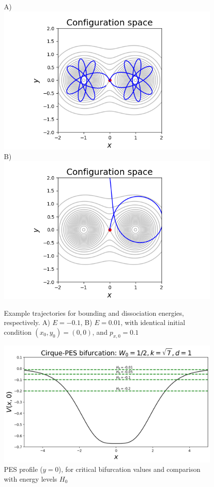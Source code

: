 \documentclass[10pt,aps,onecolumn,superscriptaddress]{revtex4-2}
\begin{document}
\begin{figure}
    \centering
    A)\includegraphics{traj_type2.png}
    B)\includegraphics{traj_escapping.png}
    \caption{Example trajectories for bounding and dissociation energies, respectively. A) $E = -0.1$, B) $E=0.01$, with identical initial condition $(x_0, y_0) = (0, 0)$, and $p_{x,0} = 0.1$}
    \label{fig:my_label}
\end{figure}


\begin{figure}
    \centering
    \includegraphics[width=\textwidth]{pes_bifurcation_energy_levels.png}
    \caption{PES profile ($y=0$), for critical bifurcation values and comparison with energy levels $H_0$}
\end{figure}
\end{document}
